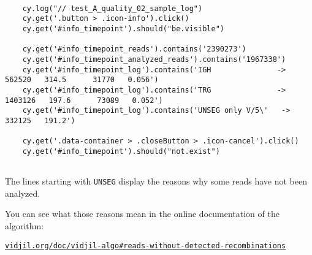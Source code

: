 \begin{verbatim}

    cy.log("// test_A_quality_02_sample_log")
    cy.get('.button > .icon-info').click()
    cy.get('#info_timepoint').should("be.visible")

    cy.get('#info_timepoint_reads').contains('2390273')
    cy.get('#info_timepoint_analyzed_reads').contains('1967338')
    cy.get('#info_timepoint_log').contains('IGH               ->   562520   314.5      31770   0.056')
    cy.get('#info_timepoint_log').contains('TRG               ->  1403126   197.6      73089   0.052')
    cy.get('#info_timepoint_log').contains('UNSEG only V/5\'   ->   332125   191.2')

    cy.get('.data-container > .closeButton > .icon-cancel').click()
    cy.get('#info_timepoint').should("not.exist")


\end{verbatim}

The lines starting with \texttt{UNSEG} display the reasons why some reads have
not been analyzed.

You can see what those reasons mean in the online documentation of the
algorithm:

 \centerline{\tt\href{http://www.vidjil.org/doc/vidjil-algo/\#reads-without-detected-recombinations}{vidjil.org/doc/vidjil-algo\#reads-without-detected-recombinations}}



